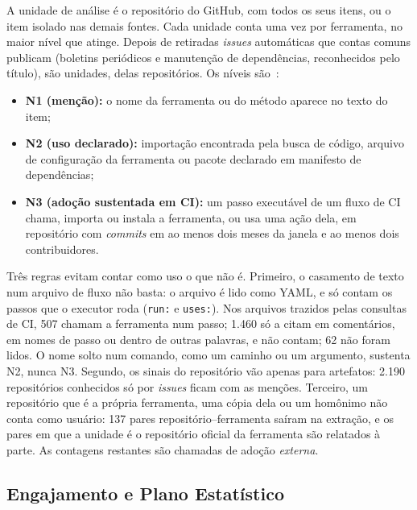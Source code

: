 \documentclass[sigconf]{acmart}
\newcommand{\EvCIVerificados}{507}       %
\newcommand{\EvCIRejeitados}{1.460}      %
\newcommand{\EvCINaoLidos}{62}           %
\newcommand{\EvReposSoIssues}{2.190}     %
\newcommand{\EvCopias}{137}              %
\begin{document}
A unidade de análise é o repositório do GitHub, com todos os seus itens, ou o item isolado nas demais fontes. Cada unidade conta uma vez por ferramenta, no maior nível que atinge. Depois de retiradas \ResItensAutomaticos{} \textit{issues} automáticas que contas comuns publicam (boletins periódicos e manutenção de dependências, reconhecidos pelo título), são \ResUnidades{} unidades, \ResUnidadesGithub{} delas repositórios. Os níveis são~\cite{raulamo2017choosing,msrkit2027}:

\begin{itemize}
  \item \textbf{N1 (menção):} o nome da ferramenta ou do método aparece no texto do item;
  \item \textbf{N2 (uso declarado):} importação encontrada pela busca de código, arquivo de configuração da ferramenta ou pacote declarado em manifesto de dependências;
  \item \textbf{N3 (adoção sustentada em CI):} um passo executável de um fluxo de CI chama, importa ou instala a ferramenta, ou usa uma ação dela, em repositório com \textit{commits} em ao menos dois meses da janela e ao menos dois contribuidores.
\end{itemize}

Três regras evitam contar como uso o que não é. Primeiro, o casamento de texto num arquivo de fluxo não basta: o arquivo é lido como YAML, e só contam os passos que o executor roda (\texttt{run:} e \texttt{uses:}). Nos arquivos trazidos pelas consultas de CI, \EvCIVerificados{} chamam a ferramenta num passo; \EvCIRejeitados{} só a citam em comentários, em nomes de passo ou dentro de outras palavras, e não contam; \EvCINaoLidos{} não foram lidos. O nome solto num comando, como um caminho ou um argumento, sustenta N2, nunca N3. Segundo, os sinais do repositório vão apenas para artefatos: \EvReposSoIssues{} repositórios conhecidos só por \textit{issues} ficam com as menções. Terceiro, um repositório que é a própria ferramenta, uma cópia dela ou um homônimo não conta como usuário: \EvCopias{} pares repositório--ferramenta saíram na extração, e os \ResSelfPares{} pares em que a unidade é o repositório oficial da ferramenta são relatados à parte. As contagens restantes são chamadas de adoção \emph{externa}.

\subsection{Engajamento e Plano Estatístico}
\label{sec:met-estatistica}
\end{document}
